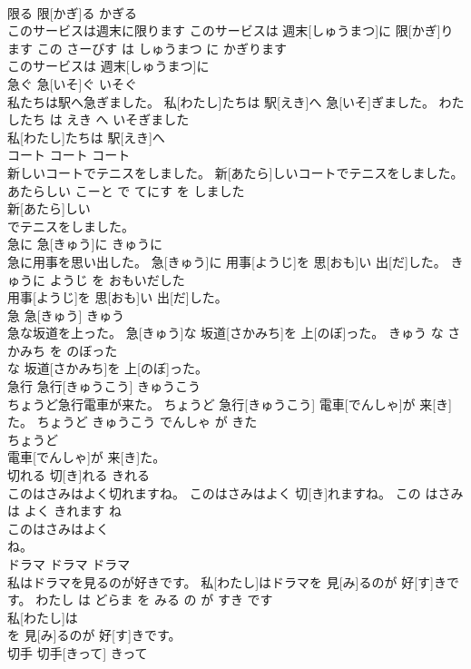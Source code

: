 \documentclass[8pt]{extreport}
\begin{document}
\begin{CJK}{UTF8}{min}
\\	限る	限[かぎ]る	かぎる	
\\	このサービスは週末に限ります	このサービスは 週末[しゅうまつ]に 限[かぎ]ります	この さーびす は しゅうまつ に かぎります	
\\	このサービスは 週末[しゅうまつ]に
\\	急ぐ	急[いそ]ぐ	いそぐ	
\\	私たちは駅へ急ぎました。	私[わたし]たちは 駅[えき]へ 急[いそ]ぎました。	わたしたち は えき へ いそぎました	
\\	私[わたし]たちは 駅[えき]へ
\\	コート	コート	コート	
\\	新しいコートでテニスをしました。	新[あたら]しいコートでテニスをしました。	あたらしい こーと で てにす を しました	
\\	新[あたら]しい
\\	でテニスをしました。			
\\	急に	急[きゅう]に	きゅうに	
\\	急に用事を思い出した。	急[きゅう]に 用事[ようじ]を 思[おも]い 出[だ]した。	きゅうに ようじ を おもいだした	
\\	用事[ようじ]を 思[おも]い 出[だ]した。			
\\	急	急[きゅう]	きゅう	
\\	急な坂道を上った。	急[きゅう]な 坂道[さかみち]を 上[のぼ]った。	きゅう な さかみち を のぼった	
\\	な 坂道[さかみち]を 上[のぼ]った。			
\\	急行	急行[きゅうこう]	きゅうこう	
\\	ちょうど急行電車が来た。	ちょうど 急行[きゅうこう] 電車[でんしゃ]が 来[き]た。	ちょうど きゅうこう でんしゃ が きた	
\\	ちょうど
\\	電車[でんしゃ]が 来[き]た。			
\\	切れる	切[き]れる	きれる	
\\	このはさみはよく切れますね。	このはさみはよく 切[き]れますね。	この はさみ は よく きれます ね	
\\	このはさみはよく
\\	ね。			
\\	ドラマ	ドラマ	ドラマ	
\\	私はドラマを見るのが好きです。	私[わたし]はドラマを 見[み]るのが 好[す]きです。	わたし は どらま を みる の が すき です	
\\	私[わたし]は
\\	を 見[み]るのが 好[す]きです。			
\\	切手	切手[きって]	きって	

\end{CJK}
\end{document}
